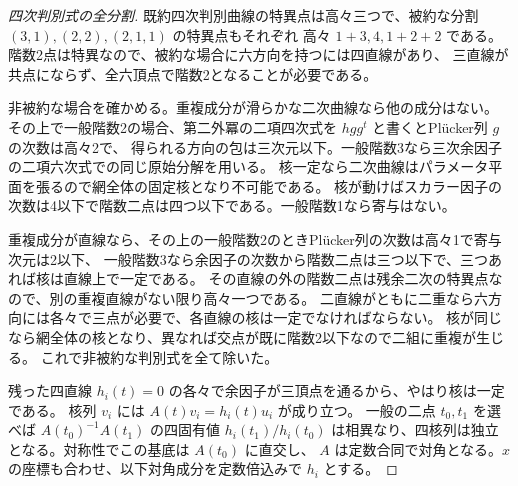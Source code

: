 \begin{proof}[四次判別式の全分割]
既約四次判別曲線の特異点は高々三つで、被約な分割 $(3,1),(2,2),(2,1,1)$ の特異点もそれぞれ
高々 $1+3,4,1+2+2$ である。階数2点は特異なので、被約な場合に六方向を持つには四直線があり、
三直線が共点にならず、全六頂点で階数2となることが必要である。

非被約な場合を確かめる。重複成分が滑らかな二次曲線なら他の成分はない。
その上で一般階数2の場合、第二外冪の二項四次式を $hgg^t$ と書くとPlücker列 $g$ の次数は高々2で、
得られる方向の包は三次元以下。一般階数3なら三次余因子の二項六次式での同じ原始分解を用いる。
核一定なら二次曲線はパラメータ平面を張るので網全体の固定核となり不可能である。
核が動けばスカラー因子の次数は4以下で階数二点は四つ以下である。一般階数1なら寄与はない。

重複成分が直線なら、その上の一般階数2のときPlücker列の次数は高々1で寄与次元は2以下、
一般階数3なら余因子の次数から階数二点は三つ以下で、三つあれば核は直線上で一定である。
その直線の外の階数二点は残余二次の特異点なので、別の重複直線がない限り高々一つである。
二直線がともに二重なら六方向には各々で三点が必要で、各直線の核は一定でなければならない。
核が同じなら網全体の核となり、異なれば交点が既に階数2以下なので二組に重複が生じる。
これで非被約な判別式を全て除いた。

残った四直線 $h_i(t)=0$ の各々で余因子が三頂点を通るから、やはり核は一定である。
核列 $v_i$ には $A(t)v_i=h_i(t)u_i$ が成り立つ。
一般の二点 $t_0,t_1$ を選べば $A(t_0)^{-1}A(t_1)$ の四固有値
$h_i(t_1)/h_i(t_0)$ は相異なり、四核列は独立となる。対称性でこの基底は $A(t_0)$ に直交し、
$A$ は定数合同で対角となる。$x$ の座標も合わせ、以下対角成分を定数倍込みで $h_i$ とする。
\end{proof}
